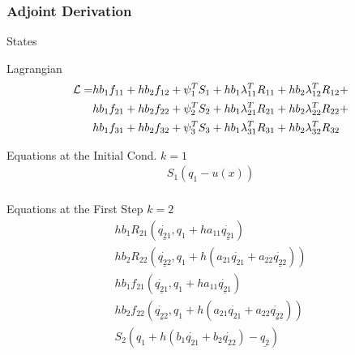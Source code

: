\documentclass{beamer}
\begin{document}
\begin{frame}[allowframebreaks] \frametitle{Adjoint Derivation}

  \begin{block}{States}
  \end{block}

  \begin{block}{Lagrangian}
    \begin{equation}\nonumber
      \begin{split}
        {\cal{L}} = &  hb_1f_{11} + hb_2f_{12} + \psi_1^T S_1 + h b_1 \lambda_{11}^TR_{11} + h b_2 \lambda_{12}^TR_{12} + \\
        & hb_1f_{21} + hb_2f_{22} + \psi_2^T S_2 + h b_1 \lambda_{21}^TR_{21} + h b_2 \lambda_{22}^TR_{22} + \\
        & hb_1f_{31} + hb_2f_{32} + \psi_3^T S_3 + h b_1 \lambda_{31}^TR_{31} + h b_2 \lambda_{32}^TR_{32} \\
      \end{split}
    \end{equation}
  \end{block}

  \framebreak

  \begin{block}{Equations at the Initial Cond. $k=1$}
    \begin{eqnarray}\nonumber
      S_1({q_1} - u(x))\\\nonumber
    \end{eqnarray}
  \end{block}

  \framebreak

  \begin{block}{ Equations at the First Step $k=2$}
    \begin{eqnarray}\nonumber
      h b_1 R_{21}\left( \underline{\dot{q_{21}}}, q_1 + h a_{11} \underline{\dot{q_{21}}}  \right)\\ \nonumber
      h b_2 R_{22}( \underline{\dot{q_{22}}}, q_1 + h (a_{21} \dot{q_{21}} + a_{22} \underline{\dot{q_{22}}}) )\\ \nonumber
      h b_1 f_{21}\left( \underline{\dot{q_{21}}}, q_1 + h a_{11} \underline{\dot{q_{21}}}  \right)\\ \nonumber
      h b_2 f_{22}( \underline{\dot{q_{22}}}, q_1 + h (a_{21} \dot{q_{21}} + a_{22} \underline{\dot{q_{22}}}) )\\ \nonumber
      S_2(  q_1 + h ( b_1\dot{q_{21}} + b_2\dot{q_{22}} ) - \underline{q_2})\\\nonumber
    \end{eqnarray}
  \end{block}


\end{frame}
\end{document}
